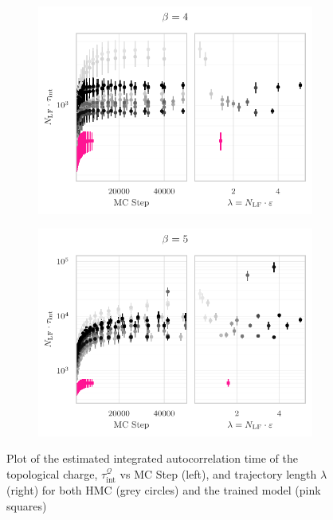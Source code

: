 \documentclass{article} %
\begin{document}
%
\begin{figure}[htpb]
   \centering
   \begin{subfigure}{0.45\textwidth}
      \includegraphics[width=\textwidth]{figures/autocorr_plots_2021_03_09/autocorr_vs_traj_len_2152_b4.pdf}
   \end{subfigure}
   \hfill
   \begin{subfigure}{0.45\textwidth}
      \includegraphics[width=\textwidth]{figures/autocorr_plots_2021_03_09/autocorr_vs_traj_len_2152_b5.pdf}
   \end{subfigure}
   \caption{\label{fig:autocorrbeta2}Plot of the estimated integrated autocorrelation time of the topological charge,
      \(\tau_{\mathrm{int}}^{\mathcal{Q}}\) vs MC Step (left), and trajectory length \(\lambda\) (right) for both HMC
   (grey circles) and the trained model (pink squares)}
\end{figure}
\end{document}

